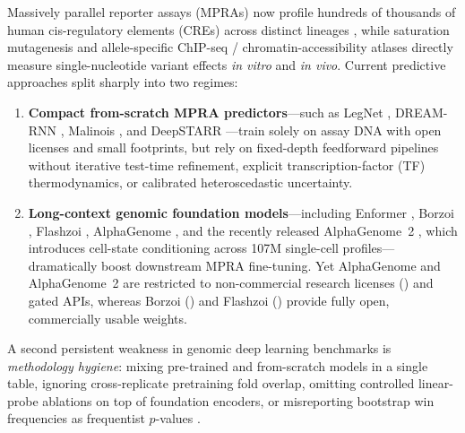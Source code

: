 \documentclass[10.5pt,a4paper]{article}
\begin{document}
Massively parallel reporter assays (MPRAs) now profile hundreds of thousands of human cis-regulatory elements (CREs) across distinct lineages \citep{agarwal2025,gosai2024,kreimer2022}, while saturation mutagenesis \citep{kircher2019} and allele-specific ChIP-seq / chromatin-accessibility atlases \citep{abramov2021,abramov2025} directly measure single-nucleotide variant effects \emph{in vitro} and \emph{in vivo}. Current predictive approaches split sharply into two regimes:
\begin{enumerate}
\item \textbf{Compact from-scratch MPRA predictors}---such as LegNet \citep{penzar2023}, DREAM-RNN \citep{rafi2024}, Malinois \citep{gosai2024}, and DeepSTARR \citep{dealmeida2022}---train solely on assay DNA with open licenses and small footprints, but rely on fixed-depth feedforward pipelines without iterative test-time refinement, explicit transcription-factor (TF) thermodynamics, or calibrated heteroscedastic uncertainty.
\item \textbf{Long-context genomic foundation models}---including Enformer \citep{avsec2021}, Borzoi \citep{linder2025}, Flashzoi \citep{hingerl2025}, AlphaGenome \citep{avsec2026}, and the recently released AlphaGenome~2 \citep{gayoso2026}, which introduces cell-state conditioning across 107M single-cell profiles---dramatically boost downstream MPRA fine-tuning. Yet AlphaGenome and AlphaGenome~2 are restricted to non-commercial research licenses () and gated APIs, whereas Borzoi () and Flashzoi () provide fully open, commercially usable weights.
\end{enumerate}

A second persistent weakness in genomic deep learning benchmarks is \emph{methodology hygiene}: mixing pre-trained and from-scratch models in a single table, ignoring cross-replicate pretraining fold overlap, omitting controlled linear-probe ablations on top of foundation encoders, or misreporting bootstrap win frequencies as frequentist $p$-values \citep{phipson2010}.
\end{document}
